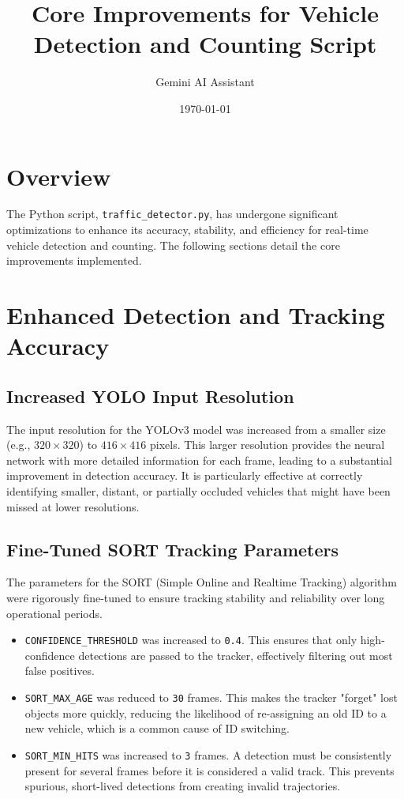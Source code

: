\documentclass{article}
\title{Core Improvements for Vehicle Detection and Counting Script}
\author{Gemini AI Assistant}
\date{\today}
\begin{document}
\maketitle

\section{Overview}
The Python script, \texttt{traffic\_detector.py}, has undergone significant optimizations to enhance its accuracy, stability, and efficiency for real-time vehicle detection and counting. The following sections detail the core improvements implemented.

\section{Enhanced Detection and Tracking Accuracy}

\subsection{Increased YOLO Input Resolution}
The input resolution for the YOLOv3 model was increased from a smaller size (e.g., \(320 \times 320\)) to \(416 \times 416\) pixels. This larger resolution provides the neural network with more detailed information for each frame, leading to a substantial improvement in detection accuracy. It is particularly effective at correctly identifying smaller, distant, or partially occluded vehicles that might have been missed at lower resolutions.

\subsection{Fine-Tuned SORT Tracking Parameters}
The parameters for the SORT (Simple Online and Realtime Tracking) algorithm were rigorously fine-tuned to ensure tracking stability and reliability over long operational periods.
\begin{itemize}
    \item \texttt{CONFIDENCE\_THRESHOLD} was increased to \texttt{0.4}. This ensures that only high-confidence detections are passed to the tracker, effectively filtering out most false positives.
    \item \texttt{SORT\_MAX\_AGE} was reduced to \texttt{30} frames. This makes the tracker "forget" lost objects more quickly, reducing the likelihood of re-assigning an old ID to a new vehicle, which is a common cause of ID switching.
    \item \texttt{SORT\_MIN\_HITS} was increased to \texttt{3} frames. A detection must be consistently present for several frames before it is considered a valid track. This prevents spurious, short-lived detections from creating invalid trajectories.
\end{itemize}
\end{document}
